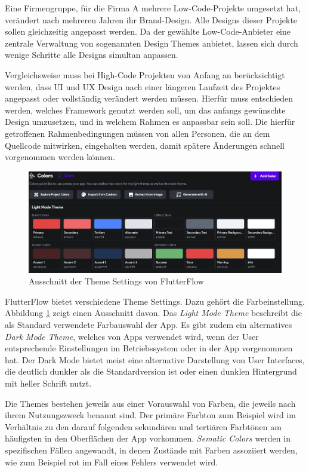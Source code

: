 \documentclass[acmtog, language=ngerman]{acmart}
\begin{document}
Eine Firmengruppe, für die Firma A mehrere Low-Code-Projekte umgesetzt hat, verändert nach mehreren Jahren ihr Brand-Design. Alle Designs dieser Projekte sollen gleichzeitig angepasst werden. Da der gewählte Low-Code-Anbieter eine zentrale Verwaltung von sogenannten Design Themes anbietet, lassen sich durch wenige Schritte alle Designs simultan anpassen.

Vergleichsweise muss bei High-Code Projekten von Anfang an berücksichtigt werden, dass UI und UX Design nach einer längeren Laufzeit des Projektes angepasst oder vollständig verändert werden müssen. Hierfür muss entschieden werden, welches Framework genutzt werden soll, um das anfangs gewünschte Design umzusetzen, und in welchem Rahmen es anpassbar sein soll. Die hierfür getroffenen Rahmenbedingungen müssen von allen Personen, die an dem Quellcode mitwirken, eingehalten werden, damit spätere Änderungen schnell vorgenommen werden können. 

\begin{figure}[h]
    \centering
    \includegraphics[width=1\linewidth]{images/Screenshot 2024-01-27 at 15.38.16.png}
    \caption{Ausschnitt der Theme Settings von FlutterFlow}
    \label{fig:flutterflow_themes}
\end{figure}

FlutterFlow bietet verschiedene Theme Settings. Dazu gehört die Farbeinstellung. Abbildung \ref{fig:flutterflow_themes} zeigt einen Ausschnitt davon. Das \textit{Light Mode Theme} beschreibt die als Standard verwendete Farbauswahl der App. Es gibt zudem ein alternatives \textit{Dark Mode Theme}, welches von Apps verwendet wird, wenn der User entsprechende Einstellungen im Betriebssystem oder in der App vorgenommen hat. Der Dark Mode bietet meist eine alternative Darstellung von User Interfaces, die deutlich dunkler als die Standardversion ist oder einen dunklen Hintergrund mit heller Schrift nutzt. 

Die Themes bestehen jeweils aus einer Vorauswahl von Farben, die jeweils nach ihrem Nutzungszweck benannt sind. Der primäre Farbton zum Beispiel wird im Verhältnis zu den darauf folgenden sekundären und tertiären Farbtönen am häufigsten in den Oberflächen der App vorkommen. \textit{Sematic Colors} werden in spezifischen Fällen angewandt, in denen Zustände mit Farben assoziiert werden, wie zum Beispiel rot im Fall eines Fehlers verwendet wird. 
\end{document}
